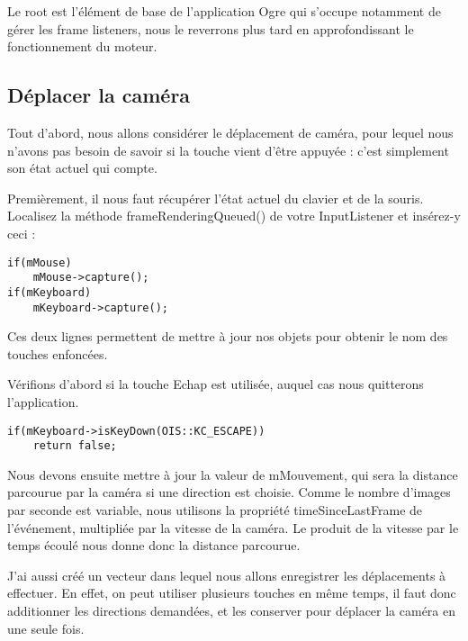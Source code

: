 \documentclass[10pt,a4paper]{report}
\begin{document}
Le root est l'\'el\'ement de base de l'application Ogre qui s'occupe notamment de g\'erer les frame listeners, nous le reverrons plus tard en approfondissant le fonctionnement du moteur.
 









\subsection{D\'eplacer la cam\'era}


Tout d'abord, nous allons consid\'erer le d\'eplacement de cam\'era, pour lequel nous n'avons pas besoin de savoir si la touche vient d'\^etre appuy\'ee : c'est simplement son \'etat actuel qui compte.

Premi\`erement, il nous faut r\'ecup\'erer l'\'etat actuel du clavier et de la souris. Localisez la m\'ethode frameRenderingQueued() de votre InputListener et ins\'erez-y ceci :


\begin{lstlisting}[caption={}]
if(mMouse)
    mMouse->capture();
if(mKeyboard)
    mKeyboard->capture();
\end{lstlisting}

Ces deux lignes permettent de mettre \`a jour nos objets pour obtenir le nom des touches enfonc\'ees.\newline

V\'erifions d'abord si la touche Echap est utilis\'ee, auquel cas nous quitterons l'application.


\begin{lstlisting}[caption={}]
if(mKeyboard->isKeyDown(OIS::KC_ESCAPE))
    return false;
\end{lstlisting}

Nous devons ensuite mettre \`a jour la valeur de mMouvement, qui sera la distance parcourue par la cam\'era si une direction est choisie. Comme le nombre d'images par seconde est variable, nous utilisons la propri\'et\'e timeSinceLastFrame de l'\'ev\'enement, multipli\'ee par la vitesse de la cam\'era. Le produit de la vitesse par le temps \'ecoul\'e nous donne donc la distance parcourue.

J'ai aussi cr\'e\'e un vecteur dans lequel nous allons enregistrer les d\'eplacements \`a effectuer. En effet, on peut utiliser plusieurs touches en m\^eme temps, il faut donc additionner les directions demand\'ees, et les conserver pour d\'eplacer la cam\'era en une seule fois.
\end{document}
